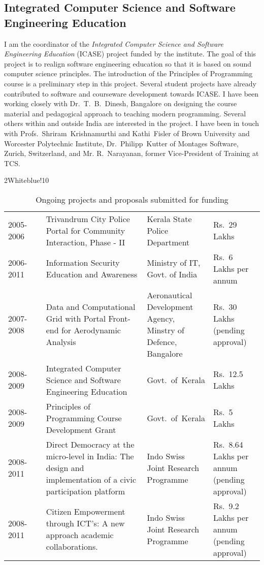 \documentclass[titlepage, %
11pt, 
]{article}
\begin{document}
\subsection{Integrated Computer Science and Software Engineering Education}
\label{subsec:icase}
I am the coordinator of the {\em Integrated Computer Science
  and Software Engineering Education\/} (ICASE) project
funded by the institute.  The goal of this project is to
realign software engineering education so that it is based
on sound computer science principles.  The introduction of
the Principles of Programming course is a preliminary step
in this project.  Several student projects have already
contributed to software and courseware development towards
ICASE.  I have been working closely with Dr.~T.~B.~Dinesh,
Bangalore on designing the course material and pedagogical
approach to teaching modern programming.  Several others
within and outside India are interested in the project.  I
have been in touch with Profs.~Shriram~Krishnamurthi and
Kathi~Fisler of Brown University and Worcester Polytechnic
Institute, Dr.~Philipp~Kutter of Montages Software, Zurich,
Switzerland, and Mr.  R.~Narayanan, former Vice-President of
Training at TCS.


\begin{table}
\rowcolors%
{2}{White}{blue!10}
\setlength\extrarowheight{4pt}
\begin{tabular}%
{|p{0.15\linewidth}|p{0.40\linewidth}|p{0.25\linewidth}|p{0.20\linewidth}|}
\hline
\multicolumn{1}{|m{0.15\linewidth}|}{\centering {\bf Duration}}&
\multicolumn{1}{m{0.40\linewidth}|}{\centering {\bf Project Title}}&
\multicolumn{1}{m{0.25\linewidth}|}{\centering {\bf Funding Agency}}&
\multicolumn{1}{m{0.20\linewidth}|}{\centering {\bf Amount}}\\
\hline
2005-2006 & Trivandrum City Police Portal for Community Interaction, Phase - II & Kerala State Police Department & Rs.~29 Lakhs\\
2006-2011 & Information Security Education and Awareness & Ministry of IT, Govt. of India & Rs.~6 Lakhs per annum\\
2007-2008 & Data and Computational Grid with Portal Front-end for Aerodynamic Analysis & Aeronautical Development Agency, Minstry of Defence, Bangalore & Rs.~30 Lakhs (pending approval)\\
2008-2009 & Integrated Computer Science and Software Engineering Education & Govt.~of~Kerala& Rs.~12.5 Lakhs\\
2008-2009 & Principles of Programming Course Development Grant & Govt.~of~Kerala& Rs.~5 Lakhs\\
2008-2011 & Direct Democracy at the micro-level in India:  The design and implementation of a civic participation platform & Indo Swiss Joint Research Programme & Rs.~8.64 Lakhs per annum (pending approval)\\
2008-2011 & Citizen Empowerment through ICT's: A new approach academic collaborations.  & Indo Swiss Joint Research Programme & Rs.~9.2 Lakhs per annum (pending approval)\\
\hline
\end{tabular}
\caption{Ongoing projects and proposals submitted for funding \label{tbl:projects}}
\end{table}
\end{document}

